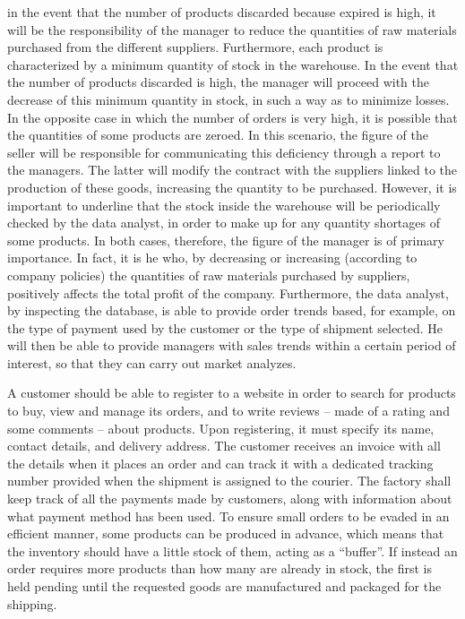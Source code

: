 in the event that the number of products discarded because expired is high, it will be the responsibility of the manager to reduce the quantities of raw materials
purchased from the different suppliers. Furthermore, each product is characterized by a minimum quantity of stock in the warehouse. In the event that the number of
products discarded is high, the manager will proceed with the decrease of this minimum quantity in stock, in such a way as to minimize losses.
In the opposite case in which the number of orders is very high, it is possible that the quantities of some products are zeroed. In this scenario, the figure of
the seller will be responsible for communicating this deficiency through a report to the managers. The latter will modify the contract with the suppliers linked
to the production of these goods, increasing the quantity to be purchased.
However, it is important to underline that the stock inside the warehouse will be periodically checked by the data analyst, in order to make up for any quantity
shortages of some products.
In both cases, therefore, the figure of the manager is of primary importance. In fact, it is he who, by decreasing or increasing (according to company policies)
the quantities of raw materials purchased by suppliers, positively affects the total profit of the company.
Furthermore, the data analyst, by inspecting the database, is able to provide order trends based, for example, on the type of payment used by the customer or
the type of shipment selected. He will then be able to provide managers with sales trends within a certain period of interest, so that they can carry out market analyzes.

A customer should be able to register to a website in order to search for products to buy, view and manage its orders, and to write reviews -- made of a rating and
some comments -- about products. Upon registering, it must specify its name, contact details, and delivery address. The customer receives an invoice with all the
details when it places an order and can track it with a dedicated tracking number provided when the shipment is assigned to the courier. The factory shall keep track of all the payments made by customers, along with information about what payment method has been used. To ensure small orders to
be evaded in an efficient manner, some products can be produced in advance, which means that the inventory should have a little stock of them, acting as a ``buffer''.
If instead an order requires more products than how many are already in stock, the first is held pending until the requested goods are manufactured and packaged for
the shipping.

